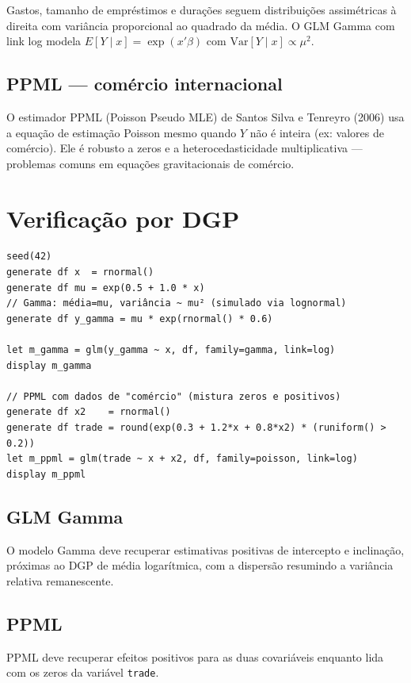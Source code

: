 Gastos, tamanho de empréstimos e durações seguem distribuições assimétricas
à direita com variância proporcional ao quadrado da média. O GLM Gamma com
link log modela $E[Y \mid x] = \exp(x'\beta)$ com $\mathrm{Var}[Y\mid x] \propto \mu^2$.

\subsection*{PPML — comércio internacional}

O estimador PPML (Poisson Pseudo MLE) de Santos Silva e Tenreyro (2006) usa
a equação de estimação Poisson mesmo quando $Y$ não é inteira (ex: valores
de comércio). Ele é robusto a zeros e a heterocedasticidade multiplicativa
— problemas comuns em equações gravitacionais de comércio.

\section{Verificação por DGP}

\begin{lstlisting}[caption={GLM Gamma e PPML}]
seed(42)
generate df x  = rnormal()
generate df mu = exp(0.5 + 1.0 * x)
// Gamma: média=mu, variância ~ mu² (simulado via lognormal)
generate df y_gamma = mu * exp(rnormal() * 0.6)

let m_gamma = glm(y_gamma ~ x, df, family=gamma, link=log)
display m_gamma

// PPML com dados de "comércio" (mistura zeros e positivos)
generate df x2    = rnormal()
generate df trade = round(exp(0.3 + 1.2*x + 0.8*x2) * (runiform() > 0.2))
let m_ppml = glm(trade ~ x + x2, df, family=poisson, link=log)
display m_ppml
\end{lstlisting}

\subsection*{GLM Gamma}

O modelo Gamma deve recuperar estimativas positivas de intercepto e inclinação,
próximas ao DGP de média logarítmica, com a dispersão resumindo a variância
relativa remanescente.

\subsection*{PPML}

PPML deve recuperar efeitos positivos para as duas covariáveis enquanto lida
com os zeros da variável \texttt{trade}.

